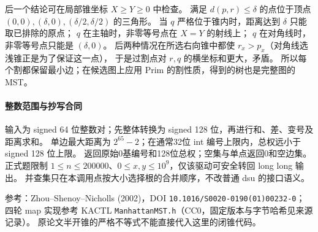 后一个结论可在局部锥坐标 $X\ge Y\ge0$ 中检查。
满足 $d(p,r)\le\delta$ 的点位于顶点
$(0,0),(\delta,0),(\delta/2,\delta/2)$ 的三角形。
当 $q$ 严格位于锥内时，距离达到 $\delta$ 只能取已排除的原点；
$q$ 在主轴时，非零等号点在 $X=Y$ 的射线上；
$q$ 在对角线时，非零等号点只能是 $(\delta,0)$。
后两种情况在所选右向锥中都使 $r_x>p_x$（对角线选浅锥正是为了保证这一点），
于是过割点对 $r,q$ 的横坐标和更大，矛盾。
所以每个割都保留最小边；在候选图上应用 Prim 的割性质，得到的树也是完整图的 MST。

\paragraph{整数范围与抄写合同}
输入为 signed 64 位整数对；先整体转换为 signed 128 位，再进行和、差、变号及距离求和。
单边最大距离为 $2^{65}-2$；在通常32位 int 编号上限内，总权远小于 signed 128 位上限。
返回原始0基编号和128位总权；空集与单点返回0和空边集。
正式题限制 $1\le n\le200000$、$0\le x,y\le10^9$，仅该驱动可安全转回 long long 输出。
并查集只在本调用点按大小选择根的合并顺序，不改普通 dsu 的接口语义。

参考：Zhou--Shenoy--Nicholls (2002)，DOI \texttt{10.1016/S0020-0190(01)00232-0}；
四轮 map 实现参考 KACTL \texttt{ManhattanMST.h}（CC0，固定版本与字节哈希见来源记录）。
原论文半开锥的严格不等式不能直接代入这里的闭锥代码。
